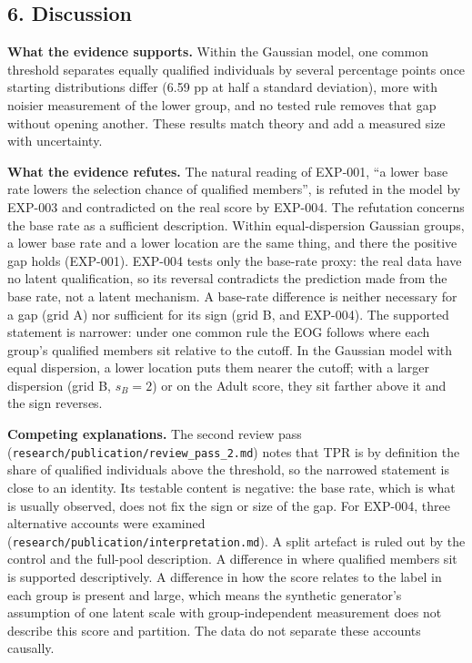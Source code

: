 \documentclass[
]{article}
\begin{document}
\subsection{6. Discussion}\label{discussion}

\textbf{What the evidence supports.} Within the Gaussian model, one
common threshold separates equally qualified individuals by several
percentage points once starting distributions differ (6.59 pp at half a
standard deviation), more with noisier measurement of the lower group,
and no tested rule removes that gap without opening another. These
results match theory and add a measured size with uncertainty.

\textbf{What the evidence refutes.} The natural reading of EXP-001, ``a
lower base rate lowers the selection chance of qualified members'', is
refuted in the model by EXP-003 and contradicted on the real score by
EXP-004. The refutation concerns the base rate as a sufficient
description. Within equal-dispersion Gaussian groups, a lower base rate
and a lower location are the same thing, and there the positive gap
holds (EXP-001). EXP-004 tests only the base-rate proxy: the real data
have no latent qualification, so its reversal contradicts the prediction
made from the base rate, not a latent mechanism. A base-rate difference
is neither necessary for a gap (grid A) nor sufficient for its sign
(grid B, and EXP-004). The supported statement is narrower: under one
common rule the EOG follows where each group's qualified members sit
relative to the cutoff. In the Gaussian model with equal dispersion, a
lower location puts them nearer the cutoff; with a larger dispersion
(grid B, \(s_B = 2\)) or on the Adult score, they sit farther above it
and the sign reverses.

\textbf{Competing explanations.} The second review pass
(\texttt{research/publication/review\_pass\_2.md}) notes that TPR is by
definition the share of qualified individuals above the threshold, so
the narrowed statement is close to an identity. Its testable content is
negative: the base rate, which is what is usually observed, does not fix
the sign or size of the gap. For EXP-004, three alternative accounts
were examined (\texttt{research/publication/interpretation.md}). A split
artefact is ruled out by the control and the full-pool description. A
difference in where qualified members sit is supported descriptively. A
difference in how the score relates to the label in each group is
present and large, which means the synthetic generator's assumption of
one latent scale with group-independent measurement does not describe
this score and partition. The data do not separate these accounts
causally.
\end{document}
